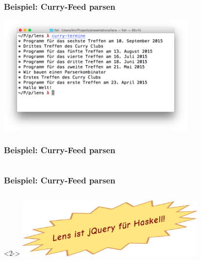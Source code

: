 \documentclass{beamer}
\begin{document}
\begin{frame}
  \frametitle{Beispiel: Curry-Feed parsen}
  \begin{center}
    \includegraphics[width=10cm]{images/curry-termine-screenshot.png}
  \end{center}
\end{frame}

\begin{frame}
  \frametitle{Beispiel: Curry-Feed parsen}
  \inputminted[fontsize=\footnotesize]{xml}{curry-feed.xml}
\end{frame}

{
\begin{frame}[b]
  \frametitle{Beispiel: Curry-Feed parsen}
  \inputminted[fontsize=\small]{haskell}{curry-termine/Main.hs}
  \begin{visibleenv}<2->
    \vspace{-7cm}
    \hfill \includegraphics[height=3cm]{images/lens-jquery.png}
    \vspace{4cm}
  \end{visibleenv}
\end{frame}}
\end{document}
